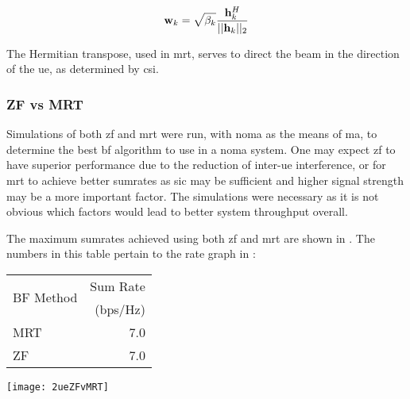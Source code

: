\begin{equation}
	\mathbf{w}_k = \sqrt{\beta_k} \frac{\mathbf{h}_k^H}{||\mathbf{h}_k||_2} 
	\label{eq:bfmrt}
\end{equation}

\par
The Hermitian transpose, used in \ac{mrt}, serves to direct the beam in the direction of the \ac{ue}, as determined by \ac{csi}.

\iffalse
\begin{figure}
	\centering
	\texttt{[image: 2ueMRT]}
	\caption{2-UE NOMA MRT BF}
	\label{fig:ZF}
\end{figure}
\fi

\subsubsection{ZF vs MRT}
Simulations of both \ac{zf} and \ac{mrt} were run, with \ac{noma} as the means of \ac{ma}, to determine the best \ac{bf} algorithm to use in a \ac{noma} system.
One may expect \ac{zf} to have superior performance due to the reduction of inter-\ac{ue} interference, or for \ac{mrt} to achieve better sumrates as \ac{sic} may be sufficient and higher signal strength may be a more important factor.
The simulations were necessary as it is not obvious which factors would lead to better system throughput overall.

\par
The maximum sumrates achieved using both \ac{zf} and \ac{mrt} are shown in .
The numbers in this table pertain to the rate graph in :

\begin{table}[htb]
	\centering
	\begin{minipage}{0.3\linewidth}
		\centering
		\captionsetup{width=0.8\linewidth}
		\label{tab:ZFvMRT}
		\begin{tabular}{l r}
			\multirow{2}{*}{BF Method} & Sum Rate\\
			 & (bps/\si{\hertz})\\
			\hline
			MRT & 7.0\\
			ZF & 7.0\\
		\end{tabular}
	\end{minipage}
	\begin{minipage}{0.6\linewidth}
		\centering
		\texttt{[image: 2ueZFvMRT]}
		\captionsetup{width=0.9\linewidth}
		\label{fig:ZFvMRT}
	\end{minipage}
\end{table}

